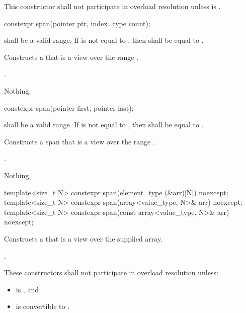 \begin{codeblock}
\begin{codeblock}
\begin{codeblock}
\begin{itemdescr}
\pnum
\remarks
This constructor shall not participate in overload resolution
unless  is .
\end{itemdescr}

%
\begin{itemdecl}
constexpr span(pointer ptr, index_type count);
\end{itemdecl}
\begin{itemdescr}
\pnum
\requires {} shall be a valid range.
If  is not equal to ,
then  shall be equal to .

\pnum
\effects
Constructs a  that is a view over the range .

\pnum
\postconditions
{}.

\pnum
\throws
Nothing.
\end{itemdescr}

%
\begin{itemdecl}
constexpr span(pointer first, pointer last);
\end{itemdecl}
\begin{itemdescr}
\pnum
\requires
{} shall be a valid range.
If  is not equal to ,
then  shall be equal to .

\pnum
\effects
Constructs a span that is a view over the range .

\pnum
\postconditions
{}.

\pnum
\throws
Nothing.
\end{itemdescr}

%
\begin{itemdecl}
template<size_t N> constexpr span(element_type (&arr)[N]) noexcept;
template<size_t N> constexpr span(array<value_type, N>& arr) noexcept;
template<size_t N> constexpr span(const array<value_type, N>& arr) noexcept;
\end{itemdecl}
\begin{itemdescr}
\pnum
\effects
Constructs a  that is a view over the supplied array.

\pnum
\postconditions
{}.

\pnum
\remarks
These constructors shall not participate in overload resolution unless:
\begin{itemize}
\item {} is , and
\item {} is convertible to .
\end{itemize}
\end{itemdescr}


\end{codeblock}
\end{codeblock}
\end{codeblock}
